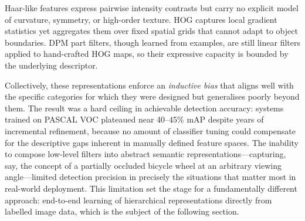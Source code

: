 \documentclass[conference]{IEEEtran}
\begin{document}
Haar-like features express pairwise intensity contrasts but
carry no explicit model of curvature, symmetry, or high-order
texture.
HOG captures local gradient statistics yet aggregates them
over fixed spatial grids that cannot adapt to object boundaries.
DPM part filters, though learned from examples, are still
linear filters applied to hand-crafted HOG maps, so their
expressive capacity is bounded by the underlying descriptor.

Collectively, these representations enforce an \emph{inductive
bias} that aligns well with the specific categories for which
they were designed but generalises poorly beyond them.
The result was a hard ceiling in achievable detection accuracy:
systems trained on PASCAL VOC plateaued near 40--45\% mAP
despite years of incremental refinement, because no amount of
classifier tuning could compensate for the descriptive gaps
inherent in manually defined feature spaces.
The inability to compose low-level filters into abstract
semantic representations---capturing, say, the concept of a
partially occluded bicycle wheel at an arbitrary viewing
angle---limited detection precision in precisely the situations
that matter most in real-world deployment.
This limitation set the stage for a fundamentally different
approach: end-to-end learning of hierarchical representations
directly from labelled image data, which is the subject of
the following section.



\end{document}

